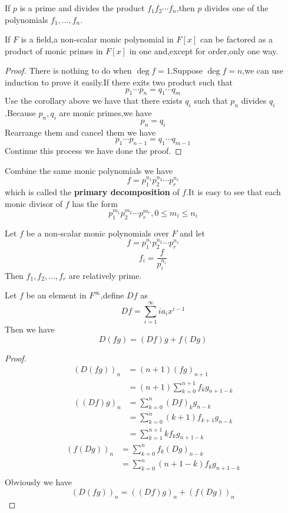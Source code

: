 \documentclass{article}
\begin{document}
\begin{coro}
	If $p$ is a prime and divides the product $f_1f_2\cdots f_n$,then $p$ divides one of the polynomials $f_1,\dots,f_n$.
\end{coro}
\begin{thm}
	If $F$ is a field,a non-scalar monic polynomial in $F[x]$ can be factored as a product of monic primes in $F[x]$ in one and,except for order,only one way. 
\end{thm}
\begin{proof}
	There is nothing to do when $\deg f=1$.Suppose $\deg f=n$,we can use induction to prove it easily.If there exits two product such that
	\[p_1\cdots p_n=q_1\cdots q_m\]
	Use the corollary above we have that there exists $q_i$ such that $p_n$ divides $q_i$.Because $p_n,q_i$ are monic primes,we have
	\[p_n=q_i\]
	Rearrange them and cancel them we have
	\[p_1\cdots p_{n-1}=q_1\cdots q_{m-1}\]
	Continue this process we have done the proof.
\end{proof}
Combine the same monic polynomials we have
\[f=p_1^{n_1}p_2^{n_2}\cdots p_r^{n_r}\]
which is called the \textbf{primary decomposition} of $f$.It is easy to see that each monic divisor of $f$ has the form
\[p_1^{m_1}p_2^{m_2}\cdots p_r^{m_r},0\le m_i\le n_i\]
\begin{thm}
	Let $f$ be a non-scalar monic polynomials over $F$ and let
	\[f=p_1^{n_1}p_2^{n_2}\cdots p_r^{n_r}\]
	\[f_i=\frac{f}{p_i^{n_i}}\]
	Then $f_1,f_2,\dots,f_r$ are relatively prime.
\end{thm}
\begin{thm}
	Let $f$ be an element in $F^\infty$,define $Df$ as
	\[Df=\sum\limits_{i=1}^\infty ia_ix^{i-1}\]
	Then we have
	\[D(fg)=(Df)g+f(Dg)\]
\end{thm}
\begin{proof}
	\begin{align*}
		(D(fg))_n&=(n+1)(fg)_{n+1}\\
		&=(n+1)\sum\limits_{k=0}^{n+1}f_kg_{n+1-k}
	\end{align*}
	\begin{align*}
		((Df)g)_n&=\sum\limits_{k=0}^n(Df)_kg_{n-k}\\
		&=\sum\limits_{k=0}^n(k+1)f_{k+1}g_{n-k}\\
		&=\sum\limits_{k=1}^{n+1}kf_kg_{n+1-k}
	\end{align*}
	\begin{align*}
		(f(Dg))_n&=\sum\limits_{k=0}^nf_{k}(Dg)_{n-k}\\
		&=\sum\limits_{k=0}^n(n+1-k)f_{k}g_{n+1-k}\\
	\end{align*}
	Obviously we have
	\[(D(fg))_n=((Df)g)_n+(f(Dg))_n\]
\end{proof}
\end{document}
